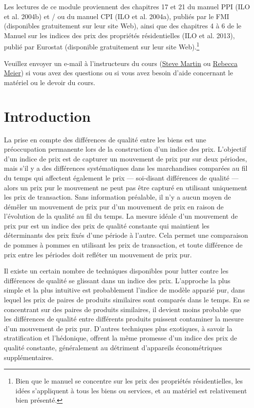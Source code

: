 \documentclass[]{article}
\begin{document}
Les lectures de ce module proviennent des chapitres 17 et 21 du manuel PPI (ILO et al. 2004b) et / ou du manuel CPI (ILO et al. 2004a), publiés par le FMI (disponibles gratuitement sur leur site Web), ainsi que des chapitres 4 à 6 de le Manuel sur les indices des prix des propriétés résidentielles (ILO et al. 2013), publié par Eurostat (disponible gratuitement sur leur site Web).\footnote{Bien que le manuel se concentre sur les prix des propriétés résidentielles, les idées s'appliquent à tous les biens ou services, et au matériel est relativement bien présenté.}

Veuillez envoyer un e-mail à l'instructeurs du cours (\href{mailto:steve.martin5@canada.ca}{Steve Martin} ou \href{mailto:rebecca.meier@canada.ca}{Rebecca Meier}) si vous avez des questions ou si vous avez besoin d'aide concernant le matériel ou le devoir du cours.

\hypertarget{introduction-1}{%
\section{Introduction}\label{introduction-1}}

La prise en compte des différences de qualité entre les biens est une préoccupation permanente lors de la construction d'un indice des prix. L'objectif d'un indice de prix est de capturer un mouvement de prix pur sur deux périodes, mais s'il y a des différences systématiques dans les marchandises comparées au fil du temps qui affectent également le prix --- soi-disant différences de qualité --- alors un prix pur le mouvement ne peut pas être capturé en utilisant uniquement les prix de transaction. Sans information préalable, il n'y a aucun moyen de démêler un mouvement de prix pur d'un mouvement de prix en raison de l'évolution de la qualité au fil du temps. La mesure idéale d'un mouvement de prix pur est un indice des prix de qualité constante qui maintient les déterminants des prix fixés d'une période à l'autre. Cela permet une comparaison de pommes à pommes en utilisant les prix de transaction, et toute différence de prix entre les périodes doit refléter un mouvement de prix pur.

Il existe un certain nombre de techniques disponibles pour lutter contre les différences de qualité se glissant dans un indice des prix. L'approche la plus simple et la plus intuitive est probablement l'indice de modèle apparié pur, dans lequel les prix de paires de produits similaires sont comparés dans le temps. En se concentrant sur des paires de produits similaires, il devient moins probable que les différences de qualité entre différents produits puissent contaminer la mesure d'un mouvement de prix pur. D'autres techniques plus exotiques, à savoir la stratification et l'hédonique, offrent la même promesse d'un indice des prix de qualité constante, généralement au détriment d'appareils économétriques supplémentaires.
\end{document}
